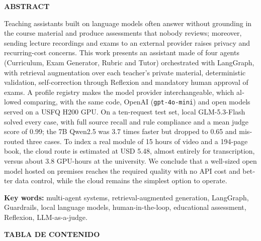 \documentclass[journal]{IEEEtran}
\newenvironment{customfontsize}{
    \fontsize{12}{14}\selectfont
}{}
\begin{document}
\begin{center}
\textbf{\fontsize{14}{16}\selectfont ABSTRACT}\\
\end{center}
\vspace{10pt}
\fontsize{12}{14}\selectfont 
{
\setlength{\parindent}{3em}
\hspace{1pt}
\foreignlanguage{english}{Teaching assistants built on language models often answer without grounding in the course material and produce assessments that nobody reviews; moreover, sending lecture recordings and exams to an external provider raises privacy and recurring-cost concerns. This work presents an assistant made of four agents (Curriculum, Exam Generator, Rubric and Tutor) orchestrated with LangGraph, with retrieval augmentation over each teacher's private material, deterministic validation, self-correction through Reflexion and mandatory human approval of exams. A profile registry makes the model provider interchangeable, which allowed comparing, with the same code, OpenAI (\texttt{gpt-4o-mini}) and open models served on a USFQ H200 GPU. On a ten-request test set, local GLM-5.3-Flash solved every case, with full source recall and rule compliance and a mean judge score of 0.99; the 7B Qwen2.5 was 3.7 times faster but dropped to 0.65 and misrouted three cases. To index a real module of 15 hours of video and a 194-page book, the cloud route is estimated at USD 5.48, almost entirely for transcription, versus about 3.8 GPU-hours at the university. We conclude that a well-sized open model hosted on premises reaches the required quality with no API cost and better data control, while the cloud remains the simplest option to operate.}\\

}
\vspace{10pt}
\begin{center}
\textbf{\fontsize{12}{14}\selectfont Key words:} \foreignlanguage{english}{multi-agent systems, retrieval-augmented generation, LangGraph, Guardrails, local language models, human-in-the-loop, educational assessment, Reflexion, LLM-as-a-judge.}
\end{center}


\newpage

\begin{center}
\textbf{\fontsize{14}{16}\selectfont TABLA DE CONTENIDO}
\end{center}

\renewcommand{\contentsname}{}
\begin{customfontsize}
    \tableofcontents
\end{customfontsize}
\end{document}
